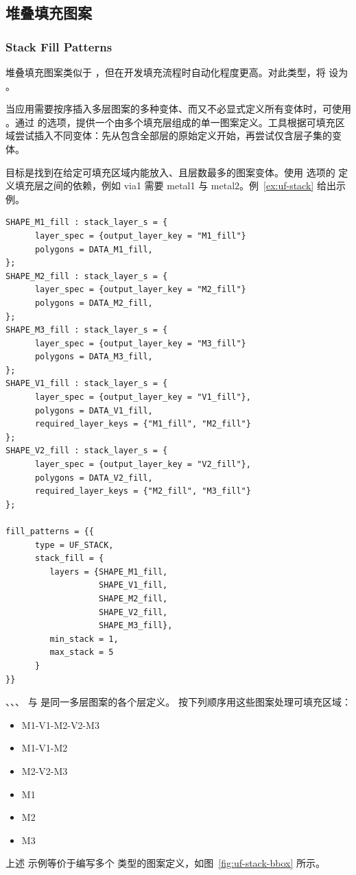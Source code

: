 
\subsection{堆叠填充图案}
\subsubsection*{Stack Fill Patterns}

堆叠填充图案类似于 ，但在开发填充流程时自动化程度更高。对此类型，将  设为 。

当应用需要按序插入多层图案的多种变体、而又不必显式定义所有变体时，可使用 。通过  的选项，提供一个由多个填充层组成的单一图案定义。工具根据可填充区域尝试插入不同变体：先从包含全部层的原始定义开始，再尝试仅含层子集的变体。

目标是找到在给定可填充区域内能放入、且层数最多的图案变体。使用  选项的  定义填充层之间的依赖，例如 via1 需要 metal1 与 metal2。例~\ref{ex:uf-stack} 给出示例。

\begin{lstlisting}[style=pxl,caption={使用 stack\_fill 选项的堆叠填充图案示例},label={ex:uf-stack}]
SHAPE_M1_fill : stack_layer_s = {
      layer_spec = {output_layer_key = "M1_fill"}
      polygons = DATA_M1_fill,
};
SHAPE_M2_fill : stack_layer_s = {
      layer_spec = {output_layer_key = "M2_fill"}
      polygons = DATA_M2_fill,
};
SHAPE_M3_fill : stack_layer_s = {
      layer_spec = {output_layer_key = "M3_fill"}
      polygons = DATA_M3_fill,
};
SHAPE_V1_fill : stack_layer_s = {
      layer_spec = {output_layer_key = "V1_fill"},
      polygons = DATA_V1_fill,
      required_layer_keys = {"M1_fill", "M2_fill"}
};
SHAPE_V2_fill : stack_layer_s = {
      layer_spec = {output_layer_key = "V2_fill"},
      polygons = DATA_V2_fill,
      required_layer_keys = {"M2_fill", "M3_fill"}
};

fill_patterns = {{
      type = UF_STACK,
      stack_fill = {
         layers = {SHAPE_M1_fill,
                   SHAPE_V1_fill,
                   SHAPE_M2_fill,
                   SHAPE_V2_fill,
                   SHAPE_M3_fill},
         min_stack = 1,
         max_stack = 5
      }
}}
\end{lstlisting}

、、、 与  是同一多层图案的各个层定义。 按下列顺序用这些图案处理可填充区域：
\begin{itemize}
  \item M1-V1-M2-V2-M3
  \item M1-V1-M2
  \item M2-V2-M3
  \item M1
  \item M2
  \item M3
\end{itemize}
上述  示例等价于编写多个  类型的图案定义，如图~\ref{fig:uf-stack-bbox} 所示。


